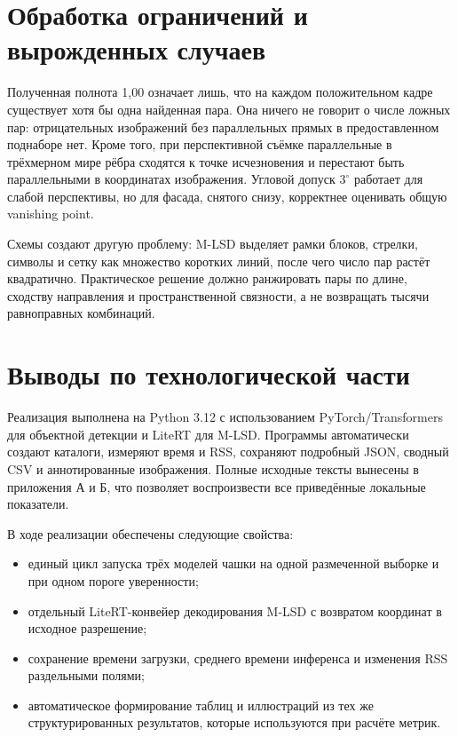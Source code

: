 \documentclass[a4paper,12pt]{extreport}
\begin{document}
\section{Обработка ограничений и вырожденных случаев}

Полученная полнота 1,00 означает лишь, что на каждом положительном кадре существует хотя бы одна найденная пара. Она ничего не говорит о числе ложных пар: отрицательных изображений без параллельных прямых в предоставленном поднаборе нет. Кроме того, при перспективной съёмке параллельные в трёхмерном мире рёбра сходятся к точке исчезновения и перестают быть параллельными в координатах изображения. Угловой допуск $3^\circ$ работает для слабой перспективы, но для фасада, снятого снизу, корректнее оценивать общую vanishing point.

Схемы создают другую проблему: M-LSD выделяет рамки блоков, стрелки, символы и сетку как множество коротких линий, после чего число пар растёт квадратично. Практическое решение должно ранжировать пары по длине, сходству направления и пространственной связности, а не возвращать тысячи равноправных комбинаций.

\section{Выводы по технологической части}

Реализация выполнена на Python 3.12 с использованием PyTorch/Transformers для объектной детекции и LiteRT для M-LSD. Программы автоматически создают каталоги, измеряют время и RSS, сохраняют подробный JSON, сводный CSV и аннотированные изображения. Полные исходные тексты вынесены в приложения А и Б, что позволяет воспроизвести все приведённые локальные показатели.

В ходе реализации обеспечены следующие свойства:
\begin{itemize}
\item единый цикл запуска трёх моделей чашки на одной размеченной выборке и при одном пороге уверенности;
\item отдельный LiteRT-конвейер декодирования M-LSD с возвратом координат в исходное разрешение;
\item сохранение времени загрузки, среднего времени инференса и изменения RSS раздельными полями;
\item автоматическое формирование таблиц и иллюстраций из тех же структурированных результатов, которые используются при расчёте метрик.
\end{itemize}
\end{document}
